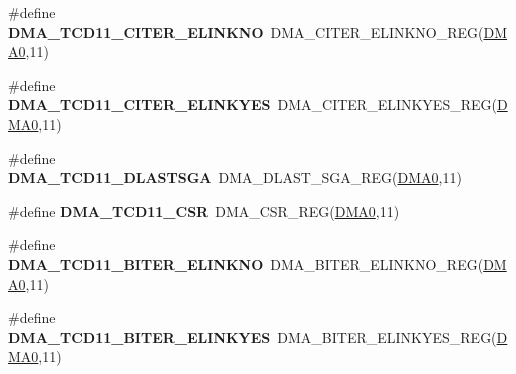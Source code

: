 \begin{DoxyCompactItemize}
\item 
\#define {\bfseries D\+M\+A\+\_\+\+T\+C\+D11\+\_\+\+C\+I\+T\+E\+R\+\_\+\+E\+L\+I\+N\+K\+NO}~D\+M\+A\+\_\+\+C\+I\+T\+E\+R\+\_\+\+E\+L\+I\+N\+K\+N\+O\+\_\+\+R\+EG(\hyperlink{group__DMA__Peripheral__Access__Layer_ga4103044f9ca209772f513dc694513ffb}{D\+M\+A0},11)\hypertarget{group__DMA__Register__Accessor__Macros_ga8f6d29f6217fa5d8123a5ee867cd228f}{}\label{group__DMA__Register__Accessor__Macros_ga8f6d29f6217fa5d8123a5ee867cd228f}

\item 
\#define {\bfseries D\+M\+A\+\_\+\+T\+C\+D11\+\_\+\+C\+I\+T\+E\+R\+\_\+\+E\+L\+I\+N\+K\+Y\+ES}~D\+M\+A\+\_\+\+C\+I\+T\+E\+R\+\_\+\+E\+L\+I\+N\+K\+Y\+E\+S\+\_\+\+R\+EG(\hyperlink{group__DMA__Peripheral__Access__Layer_ga4103044f9ca209772f513dc694513ffb}{D\+M\+A0},11)\hypertarget{group__DMA__Register__Accessor__Macros_ga7a1d5152d02587612df16a045070a150}{}\label{group__DMA__Register__Accessor__Macros_ga7a1d5152d02587612df16a045070a150}

\item 
\#define {\bfseries D\+M\+A\+\_\+\+T\+C\+D11\+\_\+\+D\+L\+A\+S\+T\+S\+GA}~D\+M\+A\+\_\+\+D\+L\+A\+S\+T\+\_\+\+S\+G\+A\+\_\+\+R\+EG(\hyperlink{group__DMA__Peripheral__Access__Layer_ga4103044f9ca209772f513dc694513ffb}{D\+M\+A0},11)\hypertarget{group__DMA__Register__Accessor__Macros_ga0232d39a5ab4dc292b79d1980ebdce51}{}\label{group__DMA__Register__Accessor__Macros_ga0232d39a5ab4dc292b79d1980ebdce51}

\item 
\#define {\bfseries D\+M\+A\+\_\+\+T\+C\+D11\+\_\+\+C\+SR}~D\+M\+A\+\_\+\+C\+S\+R\+\_\+\+R\+EG(\hyperlink{group__DMA__Peripheral__Access__Layer_ga4103044f9ca209772f513dc694513ffb}{D\+M\+A0},11)\hypertarget{group__DMA__Register__Accessor__Macros_ga2d9870d440cbc2d16186f84221454768}{}\label{group__DMA__Register__Accessor__Macros_ga2d9870d440cbc2d16186f84221454768}

\item 
\#define {\bfseries D\+M\+A\+\_\+\+T\+C\+D11\+\_\+\+B\+I\+T\+E\+R\+\_\+\+E\+L\+I\+N\+K\+NO}~D\+M\+A\+\_\+\+B\+I\+T\+E\+R\+\_\+\+E\+L\+I\+N\+K\+N\+O\+\_\+\+R\+EG(\hyperlink{group__DMA__Peripheral__Access__Layer_ga4103044f9ca209772f513dc694513ffb}{D\+M\+A0},11)\hypertarget{group__DMA__Register__Accessor__Macros_ga3663df77de1b0291986ce936d00049e4}{}\label{group__DMA__Register__Accessor__Macros_ga3663df77de1b0291986ce936d00049e4}

\item 
\#define {\bfseries D\+M\+A\+\_\+\+T\+C\+D11\+\_\+\+B\+I\+T\+E\+R\+\_\+\+E\+L\+I\+N\+K\+Y\+ES}~D\+M\+A\+\_\+\+B\+I\+T\+E\+R\+\_\+\+E\+L\+I\+N\+K\+Y\+E\+S\+\_\+\+R\+EG(\hyperlink{group__DMA__Peripheral__Access__Layer_ga4103044f9ca209772f513dc694513ffb}{D\+M\+A0},11)\hypertarget{group__DMA__Register__Accessor__Macros_ga42aed10d8bc9213b5bc04050566cb6dc}{}\label{group__DMA__Register__Accessor__Macros_ga42aed10d8bc9213b5bc04050566cb6dc}


\end{DoxyCompactItemize}
